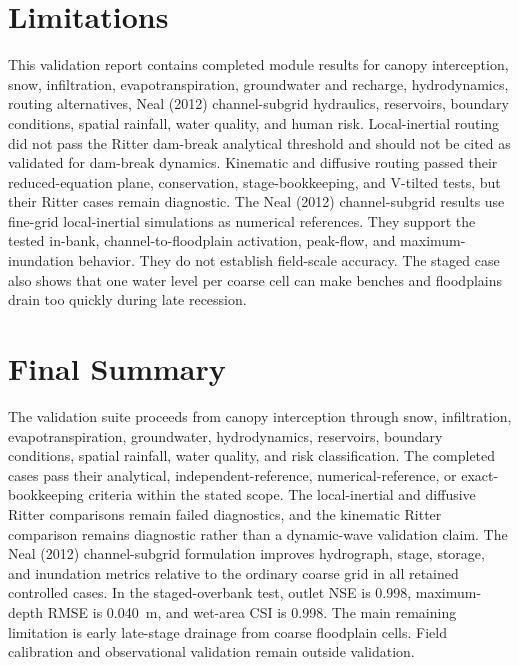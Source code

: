 \documentclass[11pt]{article}
\begin{document}
\section{Limitations}
\label{sec:limitations}
This validation report contains completed module results for canopy interception, snow, infiltration, evapotranspiration, groundwater and recharge, hydrodynamics, routing alternatives, Neal (2012) channel-subgrid hydraulics, reservoirs, boundary conditions, spatial rainfall, water quality, and human risk. Local-inertial routing did not pass the Ritter dam-break analytical threshold and should not be cited as validated for dam-break dynamics. Kinematic and diffusive routing passed their reduced-equation plane, conservation, stage-bookkeeping, and V-tilted tests, but their Ritter cases remain diagnostic. The Neal (2012) channel-subgrid results use fine-grid local-inertial simulations as numerical references. They support the tested in-bank, channel-to-floodplain activation, peak-flow, and maximum-inundation behavior. They do not establish field-scale accuracy. The staged case also shows that one water level per coarse cell can make benches and floodplains drain too quickly during late recession.

\section{Final Summary}
\label{sec:summary}
The validation suite proceeds from canopy interception through snow, infiltration, evapotranspiration, groundwater, hydrodynamics, reservoirs, boundary conditions, spatial rainfall, water quality, and risk classification. The completed cases pass their analytical, independent-reference, numerical-reference, or exact-bookkeeping criteria within the stated scope. The local-inertial and diffusive Ritter comparisons remain failed diagnostics, and the kinematic Ritter comparison remains diagnostic rather than a dynamic-wave validation claim. The Neal (2012) channel-subgrid formulation improves hydrograph, stage, storage, and inundation metrics relative to the ordinary coarse grid in all retained controlled cases. In the staged-overbank test, outlet NSE is 0.998, maximum-depth RMSE is \SI{0.040}{\meter}, and wet-area CSI is 0.998. The main remaining limitation is early late-stage drainage from coarse floodplain cells. Field calibration and observational validation remain outside validation.



\end{document}
